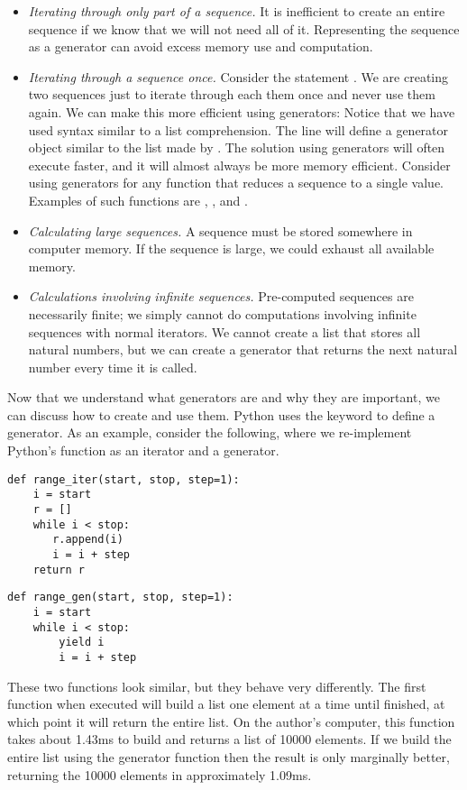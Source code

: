 \begin{itemize}
\item \emph{Iterating through only part of a sequence.}
It is inefficient to create an entire sequence if we know that we will not need all of it.
Representing the sequence as a generator can avoid excess memory use and computation.
\item \emph{Iterating through a sequence once.} Consider the statement
.
We are creating two sequences just to iterate through each them once and never use them again.
We can make this more efficient using generators:
Notice that we have used syntax similar to a list comprehension.
The line  will define a generator object similar to the list made by \li{[i for i in xrange(1000) if i\%2 == 0]}.
The solution using generators will often execute faster, and it will almost always be more memory efficient.  Consider using generators for any function that reduces a sequence to a single value.  Examples of such functions are , , and .
\item \emph{Calculating large sequences.}  A sequence must be stored somewhere in computer memory.
If the sequence is large, we could exhaust all available memory.
\item \emph{Calculations involving infinite sequences.}  Pre-computed sequences are necessarily finite; we simply cannot do computations involving infinite sequences with normal iterators. We cannot create a list that stores all natural numbers, but we can create a generator that returns the next natural number every time it is called.
\end{itemize}

Now that we understand what generators are and why they are important, we can discuss how to create and use them. Python uses the  keyword to define a generator. As an example, consider the following, where we re-implement Python's  function as an iterator and a generator.
\begin{lstlisting}
def range_iter(start, stop, step=1):
    i = start
    r = []
    while i < stop:
       r.append(i)
       i = i + step
    return r
\end{lstlisting}
\begin{lstlisting}
def range_gen(start, stop, step=1):
    i = start
    while i < stop:
        yield i
        i = i + step
\end{lstlisting}
These two functions look similar, but they behave very differently.
The first function when executed will build a list one element at a time until finished,
at which point it will return the entire list.  On the author's computer, this function takes about 1.43ms
to build and returns a list of 10000 elements.  If we build the entire list using the generator function then the result is only marginally better, returning the 10000 elements in approximately 1.09ms.

